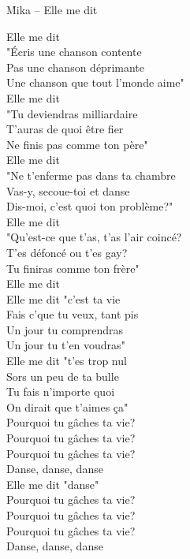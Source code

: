\documentclass{novel}
\begin{document}
\newpage
\normalsize
\h*{Mika – Elle me dit}
\begin{multicols}{2}
Elle me dit \\
"Écris une chanson contente \\
Pas une chanson déprimante \\
Une chanson que tout l'monde aime" \\

Elle me dit \\
"Tu deviendras milliardaire \\
T'auras de quoi être fier \\
Ne finis pas comme ton père" \\

Elle me dit \\
"Ne t'enferme pas dans ta chambre \\
Vas-y, secoue-toi et danse \\
Dis-moi, c'est quoi ton problème?" \\

Elle me dit \\
"Qu'est-ce que t'as, t'as l'air coincé? \\
T'es défoncé ou t'es gay? \\
Tu finiras comme ton frère" \\
Elle me dit \\

Elle me dit "c'est ta vie \\
Fais c'que tu veux, tant pis \\
Un jour tu comprendras \\
Un jour tu t'en voudras" \\

Elle me dit "t'es trop nul \\
Sors un peu de ta bulle \\
Tu fais n'importe quoi \\
On dirait que t'aimes ça" \\

Pourquoi tu gâches ta vie? \\
Pourquoi tu gâches ta vie? \\
Pourquoi tu gâches ta vie? \\
Danse, danse, danse \\
Elle me dit "danse" \\

Pourquoi tu gâches ta vie? \\
Pourquoi tu gâches ta vie? \\
Pourquoi tu gâches ta vie? \\
Danse, danse, danse \\


\end{multicols}
\end{document}
